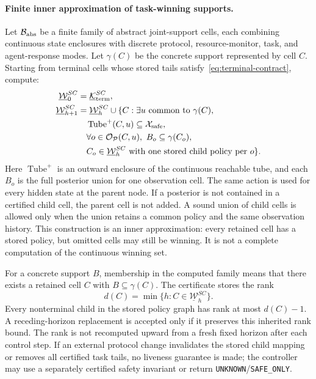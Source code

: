 \documentclass[letterpaper]{article} %
\begin{document}
\paragraph{Finite inner approximation of task-winning supports.}
Let $\mathcal B_{\rm abs}$ be a finite family of abstract joint-support cells, each combining continuous state enclosures with discrete protocol, resource-monitor, task, and agent-response modes. Let $\gamma(C)$ be the concrete support represented by cell $C$. Starting from terminal cells whose stored tails satisfy~\eqref{eq:terminal-contract}, compute:
\begin{equation}
\begin{aligned}
\underline{\mathcal W}_0^{SC}
&=\underline{\mathcal K}_{\rm term}^{SC},\\
\underline{\mathcal W}_{h+1}^{SC}
&=\underline{\mathcal W}_h^{SC}\cup
\{C:\exists u\text{ common to }\gamma(C),\\
&\quad \operatorname{Tube}^{+}(C,u)\subseteq\mathcal X_{\rm safe},\\
&\quad \forall o\in\mathcal O_{\mathcal P}(C,u),\
 B_o\subseteq\gamma(C_o),\\
&\quad C_o\in\underline{\mathcal W}_h^{SC}
 \text{ with one stored child policy per }o\}.
\end{aligned}
\label{eq:sc-inner-iteration}
\end{equation}
Here $\operatorname{Tube}^{+}$ is an outward enclosure of the continuous reachable tube, and each $B_o$ is the full posterior union for one observation cell. The same action is used for every hidden state at the parent node. If a posterior is not contained in a certified child cell, the parent cell is not added. A sound union of child cells is allowed only when the union retains a common policy and the same observation history. This construction is an inner approximation: every retained cell has a stored policy, but omitted cells may still be winning. It is not a complete computation of the continuous winning set.

For a concrete support $B$, membership in the computed family means that there exists a retained cell $C$ with $B\subseteq\gamma(C)$. The certificate stores the rank
\begin{equation}
d(C)=\min\{h:C\in\underline{\mathcal W}_h^{SC}\}.
\label{eq:abstract-rank}
\end{equation}
Every nonterminal child in the stored policy graph has rank at most $d(C)-1$. A receding-horizon replacement is accepted only if it preserves this inherited rank bound. The rank is not recomputed upward from a fresh fixed horizon after each control step. If an external protocol change invalidates the stored child mapping or removes all certified task tails, no liveness guarantee is made; the controller may use a separately certified safety invariant or return \texttt{UNKNOWN}/\texttt{SAFE\_ONLY}.
\end{document}
